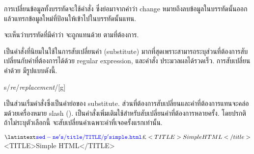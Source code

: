 \begin{thwbr}
\medskip
การเปลี่ยนข้อมูลทั้งบรรทัดจะใช้คำสั่ง  ซึ่งย่อมาจากคำว่า change หมายถึงลบข้อมูลในบรรทัดนั้นออกแล้วแทรกข้อมูลใหม่ที่ป้อนให้เข้าไปในบรรทัดนั้นแทน.
\begin{MyExample}
\end{MyExample}%
จะเห็นว่าบรรทัดที่มีคำว่า  จะถูกแทนด้วย  ตามที่ต้องการ.

\medskip
{} เป็นคำสั่งที่นิยมในใช้ในการสับเปลี่ยนคำ (substitute) มากที่สุดเพราะสามารถระบุส่วนที่ต้องการสับเปลี่ยนกับคำที่ต้องการได้ด้วย regular expression, และคำสั่ง  ประมวลผลได้รวดเร็ว. การสับเปลี่ยนคำด้วย  มีรูปแบบดังนี้.

\begin{MyVerbatim}
s/\textit{re}/\textit{replacement}/[g] 
\end{MyVerbatim}

 เป็นส่วนเริ่มคำสั่งซึ่งเป็นคำย่อของ substitute. ส่วนที่ต้องการสับเปลี่ยนและคำที่ต้องการแทนจะคล่อมด้วยเครื่องหมาย slash (\cmd{/}).  เป็นคำสั่งเพิ่มเติมใช้สำหรับสับเปลี่ยนคำที่ต้องการหลายครั้ง. โดยปรกติถ้าไม่ระบุตัวเลือกนี้  จะสับเปลี่ยนคำเฉพาะคำที่เจอครั้งแรกเท่านั้น.

\begin{MyExample}
\begin{MyEx}
$ 
<TITLE>Simple HTML</title>
$ 
<TITLE>Simple HTML</TITLE>
\end{MyEx}
\end{MyExample}


\end{thwbr}
